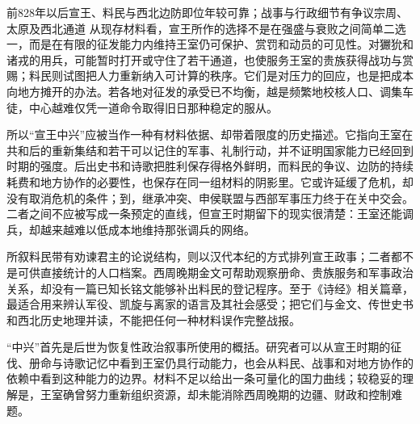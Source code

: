 \begin{event}{前828年以后}{宣王、料民与西北边防}{即位年较可靠；战事与行政细节有争议}{宗周、太原及西北通道}
从现存材料看，宣王所作的选择不是在强盛与衰败之间简单二选一，而是在有限的征发能力内维持王室仍可保护、赏罚和动员的可见性。对玁狁和诸戎的用兵，可能暂时打开或守住了若干通道，也使服务王室的贵族获得战功与赏赐；料民则试图把人力重新纳入可计算的秩序。它们是对压力的回应，也是把成本向地方摊开的办法。若各地对征发的承受已不均衡，越是频繁地校核人口、调集车徒，中心越难仅凭一道命令取得旧日那种稳定的服从。

所以“宣王中兴”应被当作一种有材料依据、却带着限度的历史描述。它指向王室在共和后的重新集结和若干可以记住的军事、礼制行动，并不证明国家能力已经回到时期的强度。后出史书和诗歌把胜利保存得格外鲜明，而料民的争议、边防的持续耗费和地方协作的必要性，也保存在同一组材料的阴影里。它或许延缓了危机，却没有取消危机的条件；到，继承冲突、申侯联盟与西部军事压力终于在关中交会。二者之间不应被写成一条预定的直线，但宣王时期留下的现实很清楚：王室还能调兵，却越来越难以低成本地维持那张调兵的网络。
\end{event}

\begin{sourcenote}[料民、铭文与诗歌各能说明什么]
所叙料民带有劝谏君主的论说结构，则以汉代本纪的方式排列宣王政事；二者都不是可供直接统计的人口档案。西周晚期金文可帮助观察册命、贵族服务和军事政治关系，却没有一篇已知长铭文能够补出料民的登记程序。至于《诗经》相关篇章，最适合用来辨认军役、凯旋与离家的语言及其社会感受；把它们与金文、传世史书和西北历史地理并读，不能把任何一种材料误作完整战报。
\end{sourcenote}

\begin{debate}[“中兴”不是国家能力的温度计]
“中兴”首先是后世为恢复性政治叙事所使用的概括。研究者可以从宣王时期的征伐、册命与诗歌记忆中看到王室仍具行动能力，也会从料民、战事和对地方协作的依赖中看到这种能力的边界。材料不足以给出一条可量化的国力曲线；较稳妥的理解是，王室确曾努力重新组织资源，却未能消除西周晚期的边疆、财政和控制难题。
\end{debate}

